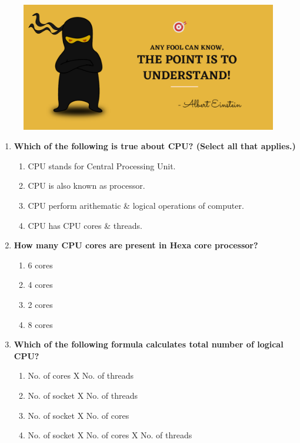 \setlength{\columnsep}{3pt}
\begin{flushleft}
	
	\paragraph{}
	\bigskip
	
	\begin{figure}[h!]
		\centering
		\includegraphics[scale=.2]{content/practise.jpg}
	\end{figure}	
	\begin{enumerate}
		
		\item \textbf{Which of the following is true about CPU? (Select all that applies.)}
		\begin{enumerate}[label=(\alph*)]
			\item CPU stands for Central Processing Unit.  %
			\item CPU is also known as processor. %
			\item CPU perform arithematic \& logical operations of computer. %
			\item CPU has CPU cores \& threads. %
		\end{enumerate}
		\bigskip
		\bigskip
		
		\item \textbf{How many CPU cores are present in Hexa core processor? }
		\begin{enumerate}[label=(\alph*)]
			\item 6 cores  %
			\item 4 cores
			\item 2 cores
			\item 8 cores
		\end{enumerate}
		\bigskip
		\bigskip	
		
		\item \textbf{Which of the following formula calculates total number of logical CPU?}
		\begin{enumerate}[label=(\alph*)]
			\item No. of cores X No. of threads
			\item No. of socket X No. of threads
			\item No. of socket X No. of cores
			\item No. of socket X No. of cores X No. of threads  %
		\end{enumerate}
		\bigskip
		\bigskip	



\end{enumerate}
\end{flushleft}
